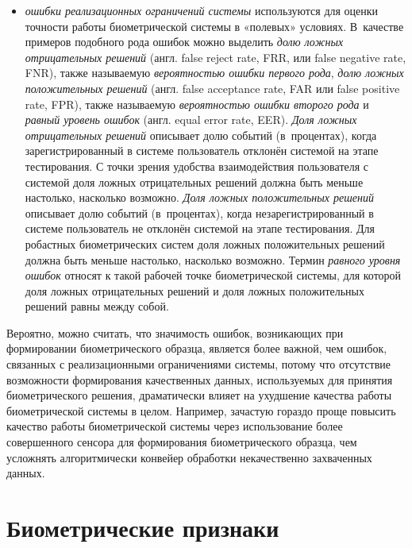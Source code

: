 \documentclass[12pt]{book}
\begin{document}
{\begin{itemize}[topsep=1pt]
\item \textit{ошибки реализационных ограничений системы} используются для оценки точности работы биометрической системы в «полевых» условиях. В~качестве примеров подобного рода ошибок можно выделить \textit{долю ложных отрицательных решений} (англ. false reject rate, FRR, или false negative rate, FNR), также называемую \textit{вероятностью ошибки первого рода}, \textit{долю ложных  положительных решений} (англ. false acceptance rate, FAR или false positive rate, FPR), также называемую \textit{вероятностью ошибки второго рода} и \textit{равный уровень ошибок} (англ. equal error rate, EER). \textit{Доля ложных отрицательных решений} описывает долю событий (в~процентах), когда зарегистрированный в системе пользователь отклонён системой на этапе тестирования. С точки зрения удобства взаимодействия пользователя с системой доля ложных отрицательных решений должна быть меньше настолько, насколько возможно. \textit{Доля ложных положительных решений} описывает долю событий (в~процентах), когда незарегистрированный в системе пользователь не отклонён системой на этапе тестирования. Для робастных биометрических систем доля ложных положительных решений должна быть меньше настолько, насколько возможно. Термин \textit{равного уровня ошибок} относят к такой рабочей точке биометрической системы, для которой доля ложных отрицательных решений и доля ложных положительных решений равны между собой.

\end{itemize}

Вероятно, можно считать, что значимость ошибок, возникающих при формировании биометрического образца, является более важной, чем ошибок, связанных с реализационными ограничениями системы, потому что отсутствие возможности формирования качественных данных, используемых для принятия биометрического решения, драматически влияет на ухудшение качества работы биометрической системы в целом. Например, зачастую гораздо проще повысить качество работы биометрической системы через использование более совершенного сенсора для формирования биометрического образца, чем усложнять алгоритмически конвейер обработки некачественно захваченных данных.
}

\section{Биометрические признаки}
\end{document}
